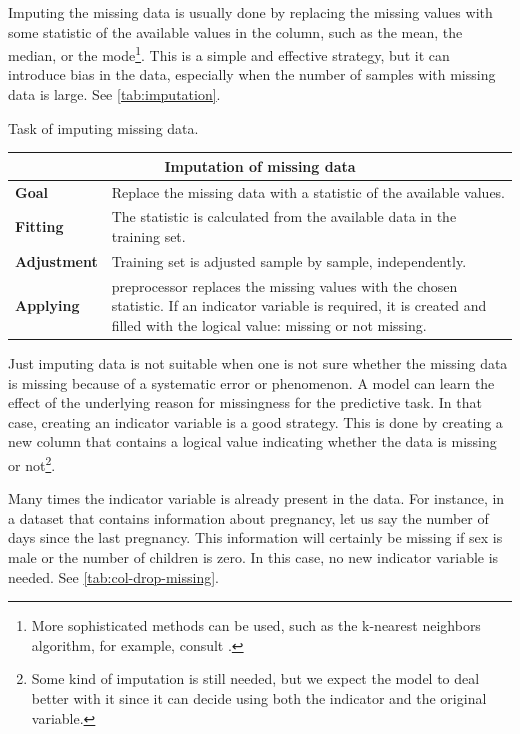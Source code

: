 Imputing the missing data is usually done by replacing the missing values with some
statistic of the available values in the column, such as the mean, the median, or the
mode\footnote{More sophisticated methods can be used, such as the k-nearest neighbors
algorithm, for example, consult .}.  This is a simple and
effective strategy, but it can introduce bias in the data, especially when the number of
samples with missing data is large.  See \cref{tab:imputation}.

\begin{tablebox}[label=tab:imputation]{Task of imputing missing data.}
  \centering
  \begin{tabular}{lp{6cm}}
    \toprule
    \multicolumn{2}{c}{\textbf{Imputation of missing data}} \\
    \midrule
    \textbf{Goal} &
      Replace the missing data with a statistic of the available values. \\
    \textbf{Fitting} &
      The statistic is calculated from the available data in the training set. \\
    \textbf{Adjustment} &
      Training set is adjusted sample by sample, independently. \\
    \textbf{Applying} &
      \Gls{preprocessor} replaces the missing values with the chosen statistic. If an indicator
      variable is required, it is created and filled with the logical value:
      missing or not missing. \\
    \bottomrule
  \end{tabular}
\end{tablebox}

Just imputing data is not suitable when one is not sure whether the missing data is
missing because of a systematic error or phenomenon.  A model can learn the effect of the
underlying reason for missingness for the predictive task.
In that case, creating an indicator variable is a good strategy.  This is done by creating
a new column that contains a logical value indicating whether the data is missing or
not\footnote{Some kind of imputation is still needed, but we expect the model to deal
better with it since it can decide using both the indicator and the original variable.}.

Many times the indicator variable is already present in the data.  For instance, in a
dataset that contains information about pregnancy, let us say the number of days since
the last pregnancy.  This information will certainly be missing if sex is male
or the number of children is zero.  In this case, no new indicator variable is needed.
See \cref{tab:col-drop-missing}.

